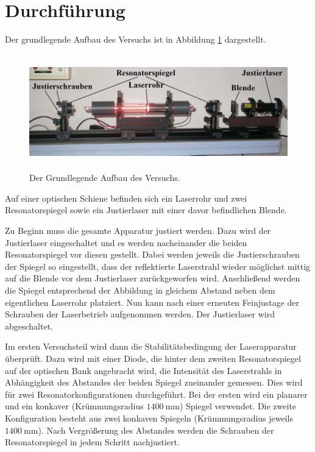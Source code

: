 \section{Durchführung}
\label{sec:Durchführung}

Der grundlegende Aufbau des Versuchs ist in Abbildung \ref{fig:aufbau} dargestellt.

\begin{figure}[H]
  \centering
  \includegraphics[height=5cm]{Aufbau.PNG}
  \caption{Der Grundlegende Aufbau des Versuchs. \cite{sample}}
  \label{fig:aufbau}
\end{figure}

Auf einer optischen Schiene befinden sich ein Laserrohr und zwei Resonatorspiegel
sowie ein Justierlaser mit einer davor befindlichen Blende.

Zu Beginn muss die gesamte Apparatur justiert werden. Dazu wird der Justierlaser
eingeschaltet und es werden nacheinander die beiden Resonatorspiegel vor diesen
gestellt. Dabei werden jeweils die Justierschrauben der Spiegel so eingestellt,
dass der reflektierte Laserstrahl wieder möglichst mittig auf die Blende vor dem
Justierlaser zurückgeworfen wird. Anschließend werden die Spiegel entsprechend
der Abbildung in gleichem Abstand neben dem eigentlichen Laserrohr platziert. Nun kann nach einer
erneuten Feinjustage der Schrauben der Laserbetrieb aufgenommen werden. Der Justierlaser
wird abgeschaltet.

Im ersten Versuchsteil wird dann die Stabilitätsbedingung der Laserapparatur überprüft.
Dazu wird mit einer Diode, die hinter dem zweiten Resonatorspiegel auf der optischen
Bank angebracht wird, die Intensität des Laserstrahls in Abhängigkeit des Abstandes
der beiden Spiegel zueinander gemessen. Dies wird für zwei Resonatorkonfigurationen
durchgeführt. Bei der ersten wird ein planarer und ein konkaver (Krümmungsradius $\SI{1400}{\milli\meter}$)
Spiegel verwendet. Die zweite Konfiguration besteht aus zwei konkaven Spiegeln
(Krümmungsradius jeweils $\SI{1400}{\milli\meter}$). Nach Vergrößerung des Abstandes
werden die Schrauben der Resonatorspiegel in jedem Schritt nachjustiert.

